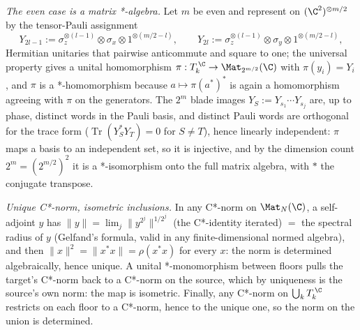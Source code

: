 \emph{The even case is a matrix *-algebra.} Let $m$ be even and represent on $(\C^2)^{\otimes m/2}$ by the tensor-Pauli assignment
\[
Y_{2l-1} := \sigma_z^{\otimes (l-1)} \otimes \sigma_x \otimes 1^{\otimes (m/2 - l)}, \qquad
Y_{2l} := \sigma_z^{\otimes (l-1)} \otimes \sigma_y \otimes 1^{\otimes (m/2 - l)} ,
\]
Hermitian unitaries that pairwise anticommute and square to one; the universal property gives a unital homomorphism $\pi : T_k^{\,\C} \to \Mat_{2^{m/2}}(\C)$ with $\pi(y_i) = Y_i$, and $\pi$ is a *-homomorphism because $a \mapsto \pi(a^*)^*$ is again a homomorphism agreeing with $\pi$ on the generators. The $2^m$ blade images $Y_S := Y_{s_1} \cdots Y_{s_j}$ are, up to phase, distinct words in the Pauli basis, and distinct Pauli words are orthogonal for the trace form ($\operatorname{Tr}(Y_S^* Y_T) = 0$ for $S \neq T$), hence linearly independent: $\pi$ maps a basis to an independent set, so it is injective, and by the dimension count $2^m = (2^{m/2})^2$ it is a *-isomorphism onto the full matrix algebra, with $*$ the conjugate transpose.

\emph{Unique C*-norm, isometric inclusions.} In any C*-norm on $\Mat_N(\C)$, a self-adjoint $y$ has $\|y\| = \lim_j \|y^{2^j}\|^{1/2^j}$ (the C*-identity iterated) $=$ the spectral radius of $y$ (Gelfand's formula, valid in any finite-dimensional normed algebra), and then $\|x\|^2 = \|x^*x\| = \rho(x^* x)$ for every $x$: the norm is determined algebraically, hence unique. A unital *-monomorphism between floors pulls the target's C*-norm back to a C*-norm on the source, which by uniqueness is the source's own norm: the map is isometric. Finally, any C*-norm on $\bigcup_k T_k^{\,\C}$ restricts on each floor to a C*-norm, hence to the unique one, so the norm on the union is determined.
